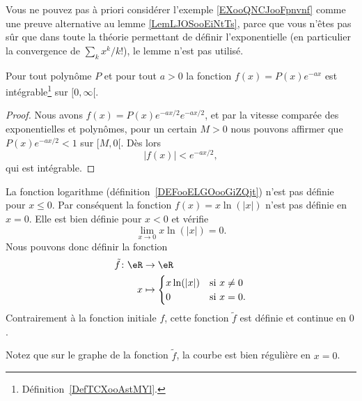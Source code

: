 \begin{remark}
    Vous ne pouvez pas à priori considérer l'exemple \ref{EXooQNCJooFpnvnf} comme une preuve alternative au lemme \ref{LemLJOSooEiNtTs}, parce que vous n'êtes pas sûr que dans toute la théorie permettant de définir l'exponentielle (en particulier la convergence de \( \sum_kx^k/k!\)), le lemme n'est pas utilisé.
\end{remark}

\begin{proposition} \label{PropBQGBooHxNrrf}
    Pour tout polynôme \( P\) et pour tout \( a>0\) la fonction \( f(x)=P(x) e^{-ax}\) est intégrable\footnote{Définition~\ref{DefTCXooAstMYl}.} sur \( \mathopen[ 0 , \infty [\).
\end{proposition}

\begin{proof}
    Nous avons \( f(x)=P(x) e^{-ax/2} e^{-ax/2}\), et par la vitesse comparée des exponentielles et polynômes, pour un certain \( M>0\) nous pouvons affirmer que \( P(x) e^{-ax/2}<1\) sur \( \mathopen[ M , 0 [\). Dès lors
        \begin{equation}
            | f(x) |< e^{-ax/2},
        \end{equation}
        qui est intégrable.
\end{proof}

\begin{example}     \label{EXooAGEOooQdQkrS}
    La fonction logarithme (définition~\ref{DEFooELGOooGiZQjt}) n'est pas définie pour \( x\leq 0\). Par conséquent la fonction \( f(x)=x\ln(|x|)\) n'est pas définie en \( x=0\). Elle est bien définie pour \( x<0\) et vérifie
    \begin{equation}
        \lim_{x\to 0} x\ln(|x|)=0.
    \end{equation}
    Nous pouvons donc définir la fonction
    \begin{equation}
        \begin{aligned}
            \tilde f\colon \eR&\to \eR \\
            x&\mapsto \begin{cases}
                x\ln(| x |)    &   \text{si } x\neq 0\\
                0    &    \text{si } x=0.
            \end{cases}
        \end{aligned}
    \end{equation}
    Contrairement à la fonction initiale \( f\), cette fonction \( \tilde f\) est définie et continue en \( 0\).

    Notez que sur le graphe de la fonction \( \tilde f\), la courbe est bien régulière en \( x=0\).
    \begin{center}
       
    \end{center}
\end{example}


